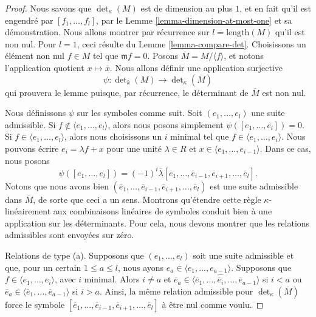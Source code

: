 \begin{proof}
Nous savons que $\det_\kappa(M)$ est de dimension au plus $1$, et en fait qu'il
est engendré par $[f_1, \ldots, f_l]$, par le
Lemme \ref{lemma-dimension-at-most-one} et sa démonstration.
Nous allons montrer par récurrence sur $l = \text{length}(M)$
qu'il est non nul. Pour $l = 1$, ceci résulte du Lemme \ref{lemma-compare-det}.
Choisissons un élément non nul $f \in M$
tel que $\mathfrak m f = 0$. Posons $\overline{M} = M /\langle f \rangle$,
et notons l'application quotient $x \mapsto \overline{x}$.
Nous allons définir une application surjective
$$
\psi : \det\nolimits_k(M) \to \det\nolimits_\kappa(\overline{M})
$$
qui prouvera le lemme puisque, par récurrence, le déterminant de
$\overline{M}$ est non nul.

\medskip\noindent
Nous définissons $\psi$ sur les symboles comme suit.
Soit $(e_1, \ldots, e_l)$ une suite admissible.
Si $f \not \in \langle e_1, \ldots, e_l \rangle$, alors
nous posons simplement $\psi([e_1, \ldots, e_l]) = 0$.
Si $f \in \langle e_1, \ldots, e_l \rangle$, alors nous choisissons
un $i$ minimal tel que $f \in \langle e_1, \ldots, e_i \rangle$.
Nous pouvons écrire $e_i = \lambda f + x$ pour une unité $\lambda \in R$
et $x \in \langle e_1, \ldots, e_{i - 1} \rangle$.
Dans ce cas, nous posons
$$
\psi([e_1, \ldots, e_l]) =
(-1)^i
\overline{\lambda}[\overline{e}_1, \ldots,
\overline{e}_{i - 1},
\overline{e}_{i + 1}, \ldots, \overline{e}_l].
$$
Notons que nous avons bien
$(\overline{e}_1, \ldots,
\overline{e}_{i - 1},
\overline{e}_{i + 1}, \ldots, \overline{e}_l)$
est une suite admissible dans $\overline{M}$, de sorte que ceci a un sens.
Montrons qu'étendre cette règle $\kappa$-linéairement aux
combinaisons linéaires de symboles conduit bien à une application sur les
déterminants. Pour cela, nous devons montrer que les relations
admissibles sont envoyées sur zéro.

\medskip\noindent
Relations de type (a). Supposons que $(e_1, \ldots, e_l)$ soit une
suite admissible et que, pour un certain $1 \leq a \leq l$, nous ayons
$e_a \in \langle e_1, \ldots, e_{a - 1}\rangle$.
Supposons que $f \in \langle e_1, \ldots, e_i\rangle$, avec $i$ minimal.
Alors $i \not = a$ et
$\overline{e}_a \in \langle \overline{e}_1, \ldots,
\hat{\overline{e}_i}, \ldots, \overline{e}_{a - 1}\rangle$ si $i < a$
ou
$\overline{e}_a \in \langle \overline{e}_1, \ldots,
\overline{e}_{a - 1}\rangle$ si $i > a$.
Ainsi, la même relation admissible pour $\det_\kappa(\overline{M})$ force
le symbole $[\overline{e}_1, \ldots,
\overline{e}_{i - 1},
\overline{e}_{i + 1}, \ldots, \overline{e}_l]$
à être nul comme voulu.


\end{proof}
